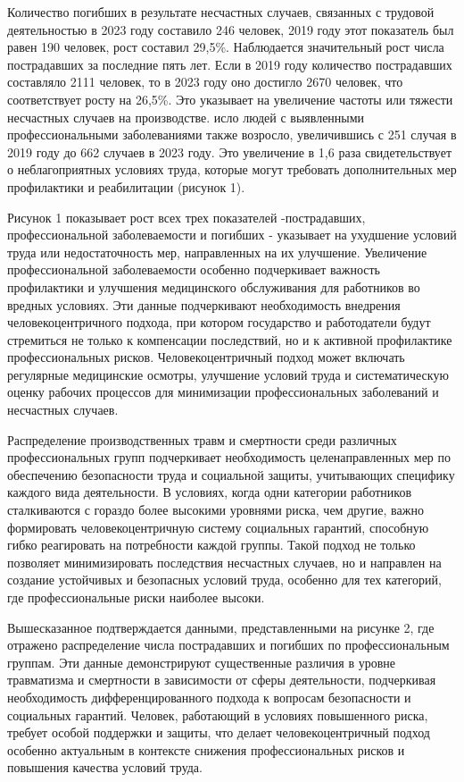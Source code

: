 \begin{multicols}{2}


  Количество погибших в результате несчастных случаев, связанных с
  трудовой деятельностью в 2023 году составило 246 человек, 2019 году этот
  показатель был равен 190 человек, рост составил 29,5\%. Наблюдается
  значительный рост числа пострадавших за последние пять лет. Если в 2019
  году количество пострадавших составляло 2111 человек, то в 2023 году оно
  достигло 2670 человек, что соответствует росту на 26,5\%. Это указывает
  на увеличение частоты или тяжести несчастных случаев на производстве.
  исло людей с выявленными профессиональными заболеваниями также возросло,
  увеличившись с 251 случая в 2019 году до 662 случаев в 2023 году. Это
  увеличение в 1,6 раза свидетельствует о неблагоприятных условиях труда,
  которые могут требовать дополнительных мер профилактики и реабилитации
  (рисунок 1).

Рисунок 1 показывает рост всех трех показателей -пострадавших,
профессиональной заболеваемости и погибших - указывает на ухудшение
условий труда или недостаточность мер, направленных на их улучшение.
Увеличение профессиональной заболеваемости особенно подчеркивает
важность профилактики и улучшения медицинского обслуживания для
работников во вредных условиях. Эти данные подчеркивают необходимость
внедрения человекоцентричного подхода, при котором государство и
работодатели будут стремиться не только к компенсации последствий, но и
к активной профилактике профессиональных рисков. Человекоцентричный
подход может включать регулярные медицинские осмотры, улучшение условий
труда и систематическую оценку рабочих процессов для минимизации
профессиональных заболеваний и несчастных случаев.

Распределение производственных травм и смертности среди различных
профессиональных групп подчеркивает необходимость целенаправленных мер
по обеспечению безопасности труда и социальной защиты, учитывающих
специфику каждого вида деятельности. В условиях, когда одни категории
работников сталкиваются с гораздо более высокими уровнями риска, чем
другие, важно формировать человекоцентричную систему социальных
гарантий, способную гибко реагировать на потребности каждой группы.
Такой подход не только позволяет минимизировать последствия несчастных
случаев, но и направлен на создание устойчивых и безопасных условий
труда, особенно для тех категорий, где профессиональные риски наиболее
высоки.

Вышесказанное подтверждается данными, представленными на рисунке 2, где
отражено распределение числа пострадавших и погибших по профессиональным
группам. Эти данные демонстрируют существенные различия в уровне
травматизма и смертности в зависимости от сферы деятельности,
подчеркивая необходимость дифференцированного подхода к вопросам
безопасности и социальных гарантий. Человек, работающий в условиях
повышенного риска, требует особой поддержки и защиты, что делает
человекоцентричный подход особенно актуальным в контексте снижения
профессиональных рисков и повышения качества условий труда.



\end{multicols}
